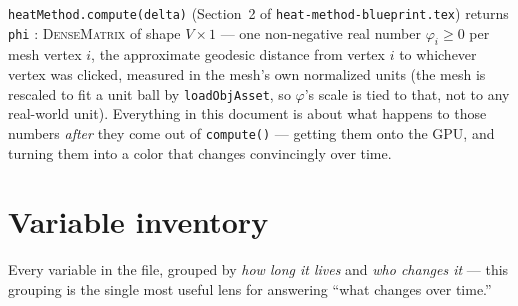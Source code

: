 \documentclass[11pt]{article}
\newcommand{\code}[1]{\texttt{#1}}
\newcommand{\type}[1]{\textsc{#1}}
\begin{document}
\code{heatMethod.compute(delta)} (Section~2 of \code{heat-method-blueprint.tex}) returns
\code{phi} : \type{DenseMatrix} of shape $V\times1$ --- one non-negative real number
$\varphi_i \ge 0$ per mesh vertex $i$, the approximate geodesic distance from vertex $i$ to
whichever vertex was clicked, measured in the mesh's own normalized units (the mesh is
rescaled to fit a unit ball by \code{loadObjAsset}, so $\varphi$'s scale is tied to that,
not to any real-world unit). Everything in this document is about what happens to those
numbers \emph{after} they come out of \code{compute()} --- getting them onto the GPU, and
turning them into a color that changes convincingly over time.

\section{Variable inventory}
\label{sec:vars}

Every variable in the file, grouped by \emph{how long it lives} and \emph{who changes it}
--- this grouping is the single most useful lens for answering ``what changes over time.''
\end{document}
